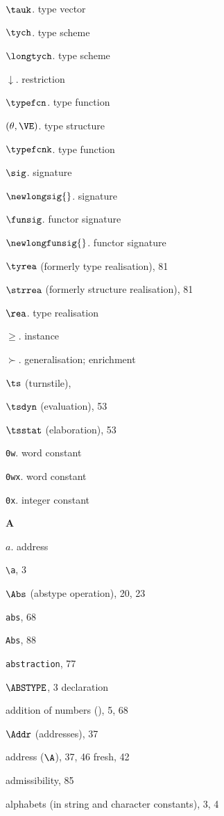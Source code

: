 \begin{theindex}
\item $\tauk$. \see type vector
\item $\tych$. \see type scheme
\item $\longtych$. \see type scheme
\item $\downarrow$. \see restriction
\item $\typefcn$. \see type function 
\item $(\theta,\VE)$. \see type structure 
\item $\typefcnk$. \see type function 
\item $\sig$. \see signature 
\item $\newlongsig{}$. \see signature 
\item $\funsig$. \see functor signature 
\item $\newlongfunsig{}$. \see functor signature
\item $\tyrea$ (formerly type realisation), 81
\item $\strrea$ (formerly structure realisation), 81
\item $\rea$. \see type realisation
\item $\geq$. \see instance 
\item $\succ$. \see generalisation; enrichment
\item $\ts$ (turnstile), \tsrefs
\item $\tsdyn$ (evaluation), 53
\item $\tsstat$ (elaboration), 53
\item {\tt 0w}. \see word constant
\item {\tt 0wx}. \see word constant
\item {\tt 0x}. \see integer constant
\indexspace
\parbox{64mm}{\hfil{\large\bf A}\hfil}
\indexspace
\item $a$. \see address 
\item \verb+\a+, 3
\item $\Abs$ (abstype operation), 20, 23
\item {\tt abs}, 68
\item {\tt Abs}, 88
\item {\tt abstraction}, 77
\item $\ABSTYPE$, 3
\subitem \seealso declaration
\item addition of numbers (\ml{+}), 5, 68
\item $\Addr$ (addresses), 37
\item address ($\A$), 37, 46
\subitem fresh, 42
\item admissibility, 85
\item alphabets (in string and character constants), 3, 4

\end{theindex}

